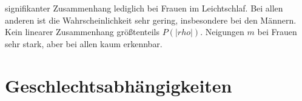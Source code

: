 signifikanter Zusammenhang lediglich bei Frauen im Leichtschlaf. Bei allen anderen ist die Wahrscheinlichkeit sehr gering, insbesondere bei den Männern. Kein linearer Zusammenhang größtenteils $P(|rho|)$. Neigungen $m$ bei Frauen sehr stark, aber bei allen kaum erkennbar.



\section{Geschlechtsabhängigkeiten}




